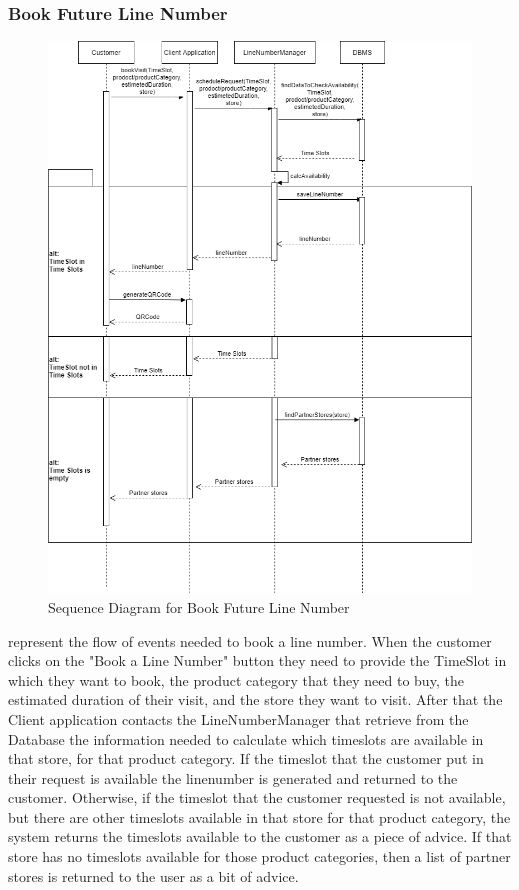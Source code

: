 \subsubsection{Book Future Line Number}
\begin{figure}[H]
    \centering
    \includegraphics[height=0.6\textwidth]{Images/CustomerSequenceDiagrams/BookLineNumberSequenceDiagram.png}
    \caption{Sequence Diagram for Book Future Line Number}
    \label{fig:SDBookLineNumber}
\end{figure}
 represent the flow of events needed to book a line number.
When the customer clicks on the "Book a Line Number" button they need to provide the TimeSlot in which they want to book, the product category that they need to buy, the estimated duration of their visit, and the store they want to visit.
After that the Client application contacts the LineNumberManager that retrieve from the Database the information needed to calculate which timeslots are available in that store, for that product category.
If the timeslot that the customer put in their request is available the linenumber is generated and returned to the customer.
Otherwise, if the timeslot that the customer requested is not available, but there are other timeslots available in that store for that product category, the system returns the timeslots available to the customer as a piece of advice.
If that store has no timeslots available for those product categories, then a list of partner stores is returned to the user as a bit of advice.

